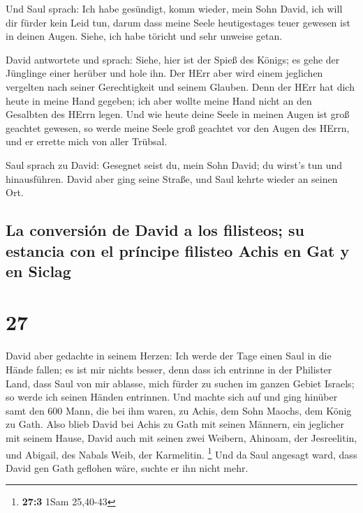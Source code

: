  Und Saul sprach: Ich habe gesündigt, komm wieder, mein
Sohn David, ich will dir fürder kein Leid tun, darum dass meine Seele
heutigestages teuer gewesen ist in deinen Augen. Siehe, ich habe töricht
und sehr unweise getan.

 David antwortete und sprach: Siehe, hier ist der Spieß
des Königs; es gehe der Jünglinge einer herüber und hole ihn.
 Der HErr aber wird einem jeglichen vergelten nach seiner
Gerechtigkeit und seinem Glauben. Denn der HErr hat dich heute in meine
Hand gegeben; ich aber wollte meine Hand nicht an den Gesalbten des
HErrn legen.  Und wie heute deine Seele in meinen Augen
ist groß geachtet gewesen, so werde meine Seele groß geachtet vor den
Augen des HErrn, und er errette mich von aller Trübsal.

 Saul sprach zu David: Gesegnet seist du, mein Sohn
David; du wirst's tun und hinausführen. David aber ging seine Straße,
und Saul kehrte wieder an seinen Ort.

\hypertarget{la-conversiuxf3n-de-david-a-los-filisteos-su-estancia-con-el-pruxedncipe-filisteo-achis-en-gat-y-en-siclag}{%
\subsection{La conversión de David a los filisteos; su estancia con el
príncipe filisteo Achis en Gat y en
Siclag}\label{la-conversiuxf3n-de-david-a-los-filisteos-su-estancia-con-el-pruxedncipe-filisteo-achis-en-gat-y-en-siclag}}

\hypertarget{section-26}{%
\section{27}\label{section-26}}

 David aber gedachte in seinem Herzen: Ich werde der Tage
einen Saul in die Hände fallen; es ist mir nichts besser, denn dass ich
entrinne in der Philister Land, dass Saul von mir ablasse, mich fürder
zu suchen im ganzen Gebiet Israels; so werde ich seinen Händen
entrinnen.  Und machte sich auf und ging hinüber samt den
600 Mann, die bei ihm waren, zu Achis, dem Sohn Maochs, dem König zu
Gath.  Also blieb David bei Achis zu Gath mit seinen
Männern, ein jeglicher mit seinem Hause, David auch mit seinen zwei
Weibern, Ahinoam, der Jesreelitin, und Abigail, des Nabals Weib, der
Karmelitin. \footnote{\textbf{27:3} 1Sam 25,40-43}  Und da
Saul angesagt ward, dass David gen Gath geflohen wäre, suchte er ihn
nicht mehr.

